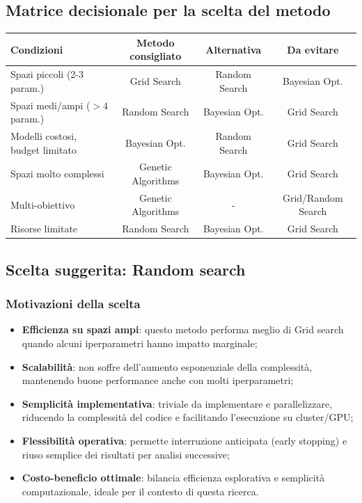\documentclass[a4paper,12pt]{report}
\begin{document}
	\subsection{Matrice decisionale per la scelta del metodo}
	\begin{table}[h]
		\centering
		\footnotesize
		\begin{tabular}{lccc}
			\toprule
			\textbf{Condizioni} & \textbf{Metodo consigliato} & \textbf{Alternativa} & \textbf{Da evitare}\\
			\midrule
			Spazi piccoli (2-3 param.) & Grid Search & Random Search & Bayesian Opt.\\
			Spazi medi/ampi ($>4$ param.) & Random Search & Bayesian Opt. & Grid Search\\
			Modelli costosi, budget limitato & Bayesian Opt. & Random Search & Grid Search\\
			Spazi molto complessi & Genetic Algorithms & Bayesian Opt. & Grid Search\\
			Multi-obiettivo & Genetic Algorithms & - & Grid/Random Search\\
			Risorse limitate & Random Search & Bayesian Opt. & Grid Search\\
			\bottomrule
		\end{tabular}
	\end{table}
	
	\subsection{Scelta suggerita: Random search}
	
	\subsubsection{Motivazioni della scelta}
	\begin{itemize}
		\item \textbf{Efficienza su spazi ampi}: questo metodo performa meglio di Grid search quando alcuni iperparametri hanno impatto marginale;
		\item \textbf{Scalabilità}: non soffre dell'aumento esponenziale della complessità, mantenendo buone performance anche con molti iperparametri;
		\item \textbf{Semplicità implementativa}: triviale da implementare e parallelizzare, riducendo la complessità del codice e facilitando l'esecuzione su cluster/GPU;
		\item \textbf{Flessibilità operativa}: permette interruzione anticipata (early stopping) e riuso semplice dei risultati per analisi successive;
		\item \textbf{Costo-beneficio ottimale}: bilancia efficienza esplorativa e semplicità computazionale, ideale per il contesto di questa ricerca.
	\end{itemize}
	
\end{document}
